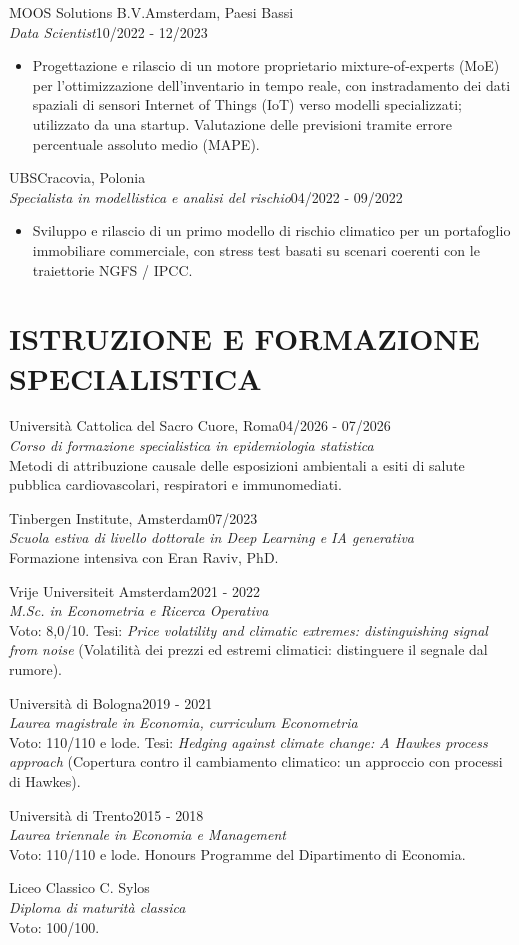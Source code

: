 \documentclass[11pt,a4paper]{article}
\newcommand{\job}[4]{\textbf{#1}\hfill #2\\\textit{#3}\hfill #4\par}
\newcommand{\education}[4]{\textbf{#1}\hfill #2\\\textit{#3}\\#4\par\vspace{10pt}}
\renewcommand{\textbf}[1]{#1}
\begin{document}
\newpage
\job{MOOS Solutions B.V.}{Amsterdam, Paesi Bassi}{Data Scientist}{10/2022 - 12/2023}
\begin{itemize}
\item Progettazione e rilascio di un motore proprietario mixture-of-experts (MoE) per l'ottimizzazione dell'inventario in tempo reale, con instradamento dei dati spaziali di sensori Internet of Things (IoT) verso modelli specializzati; utilizzato da una startup. Valutazione delle previsioni tramite errore percentuale assoluto medio (MAPE).
\end{itemize}
\vspace{6pt}
\job{UBS}{Cracovia, Polonia}{Specialista in modellistica e analisi del rischio}{04/2022 - 09/2022}
\begin{itemize}
\item Sviluppo e rilascio di un primo modello di rischio climatico per un portafoglio immobiliare commerciale, con stress test basati su scenari coerenti con le traiettorie NGFS / IPCC.
\end{itemize}

\section*{ISTRUZIONE E FORMAZIONE SPECIALISTICA}
\education{Università Cattolica del Sacro Cuore, Roma}{04/2026 - 07/2026}{Corso di formazione specialistica in epidemiologia statistica}{Metodi di attribuzione causale delle esposizioni ambientali a esiti di salute pubblica cardiovascolari, respiratori e immunomediati.}
\education{Tinbergen Institute, Amsterdam}{07/2023}{Scuola estiva di livello dottorale in Deep Learning e IA generativa}{Formazione intensiva con Eran Raviv, PhD.}
\education{Vrije Universiteit Amsterdam}{2021 - 2022}{M.Sc. in Econometria e Ricerca Operativa}{Voto: 8,0/10. Tesi: \textit{Price volatility and climatic extremes: distinguishing signal from noise} (Volatilità dei prezzi ed estremi climatici: distinguere il segnale dal rumore).}
\education{Università di Bologna}{2019 - 2021}{Laurea magistrale in Economia, curriculum Econometria}{Voto: 110/110 e lode. Tesi: \textit{Hedging against climate change: A Hawkes process approach} (Copertura contro il cambiamento climatico: un approccio con processi di Hawkes).}
\education{Università di Trento}{2015 - 2018}{Laurea triennale in Economia e Management}{Voto: 110/110 e lode. Honours Programme del Dipartimento di Economia.}
\textbf{Liceo Classico C. Sylos}\\
\textit{Diploma di maturità classica}\\
Voto: 100/100.\par\vspace{10pt}
\end{document}
